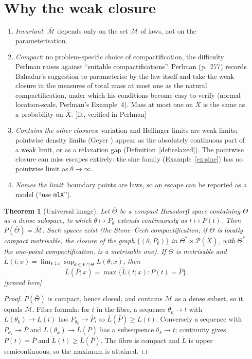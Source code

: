 \documentclass[11pt]{article}
\newcommand{\cM}{\mathcal M}
\newcommand{\bM}{\overline{\mathcal M}}
\newcommand{\bX}{\overline{X}}
\newcommand{\bP}{\overline P}
\newcommand{\bL}{\overline L}
\newcommand{\cP}{\mathcal P}
\newcommand{\status}[1]{\textsf{[#1]}}
\newtheorem{theorem}{Theorem}
\theoremstyle{definition}
\theoremstyle{remark}
\begin{document}
\section{Why the weak closure}\label{sec:why}
\begin{enumerate}
\item \emph{Invariant}: $\bM$ depends only on the set $\cM$ of laws, not on
  the parameterisation.
\item \emph{Compact}: no problem-specific choice of compactification, the
  difficulty Perlman \cite{perlman} raises against ``suitable
  compactifications''. Perlman (p.~277) records Bahadur's suggestion to
  parameterise by the law itself and take the weak closure in the measures
  of total mass at most one as the natural compactification, under which
  his conditions \cite[p.~320]{bahadur67} become easy to verify (normal
  location-scale, Perlman's Example~4). Mass at most one on $X$ is the same
  as a probability on $\bX$. \status{lit, verified in Perlman}
\item \emph{Contains the other closures}: variation and Hellinger limits are
  weak limits; pointwise density limits (Geyer \cite{geyer}) appear as the
  absolutely continuous part of a weak limit, or as a relaxation gap
  (Definition~\ref{def:relaxed}). The pointwise closure can miss escapes
  entirely: the sine family (Example~\ref{ex:sine}) has no pointwise limit as
  $\theta\to\infty$.
\item \emph{Names the limit}: boundary points are laws, so an escape can be
  reported as a model (``use \texttt{mlX}'').
\end{enumerate}

\begin{theorem}[Universal image]\label{thm:universal}
Let $\overline\Theta$ be a compact Hausdorff space containing $\Theta$ as a
dense subspace, to which $\theta\mapsto P_\theta$ extends continuously as
$t\mapsto P(t)$. Then $P(\overline\Theta)=\bM$. Such spaces exist (the
Stone--\v Cech compactification; if $\Theta$ is locally compact metrisable,
the closure of the graph $\{(\theta,P_\theta)\}$ in $\Theta^*\times\cP(\bX)$,
with $\Theta^*$ the one-point compactification, is a metrisable one). If
$\overline\Theta$ is metrisable and
$\tilde L(t;x)=\lim_{V\downarrow t}\sup_{\theta\in V\cap\Theta}L(\theta;x)$,
then
\[
 \bL(\bP;x)=\max\{\tilde L(t;x):P(t)=\bP\}.
\]
\status{proved here}
\end{theorem}
\begin{proof}
$P(\overline\Theta)$ is compact, hence closed, and contains $\cM$ as a dense
subset, so it equals $\bM$. Fibre formula: for $t$ in the fibre, a sequence
$\theta_k\to t$ with $L(\theta_k)\to\tilde L(t)$ has $P_{\theta_k}\to\bP$, so
$\bL(\bP)\ge\tilde L(t)$. Conversely a sequence with $P_{\theta_k}\to\bP$ and
$L(\theta_k)\to\bL(\bP)$ has a subsequence $\theta_k\to t$; continuity gives
$P(t)=\bP$ and $\tilde L(t)\ge\bL(\bP)$. The fibre is compact and $\tilde L$
is upper semicontinuous, so the maximum is attained.
\end{proof}
\end{document}
